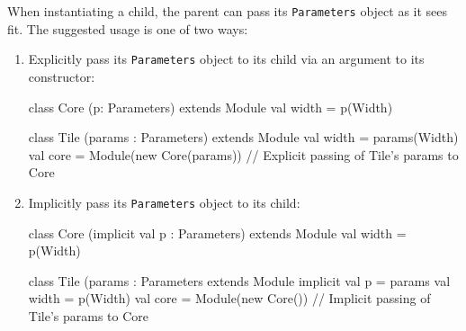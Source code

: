 \documentclass[10pt,twocolumn]{article}
\def\code#1{{\small\tt #1}}
\begin{document}
When instantiating a child, the parent can pass its \code{Parameters}
object as it sees fit. The suggested usage is one of two ways:

\begin{enumerate}
  \item Explicitly pass its \code{Parameters} object to its child via
    an argument to its constructor:
\begin{scala}

class Core (p: Parameters) extends Module { 
  val width = p(Width)
}
  
class Tile (params : Parameters) extends Module { 
  val width = params(Width) 
  val core = Module(new Core(params))
  // Explicit passing of Tile's params to Core
}

\end{scala}
  \item Implicitly pass its \code{Parameters} object to its child:
\begin{scala}

class Core (implicit val p : Parameters) extends Module { 
  val width = p(Width)
}

class Tile (params : Parameters extends Module { 
  implicit val p = params
  val width = p(Width)
  val core = Module(new Core())
  // Implicit passing of Tile's params to Core
}
\end{scala}
\end{enumerate}
\end{document}
